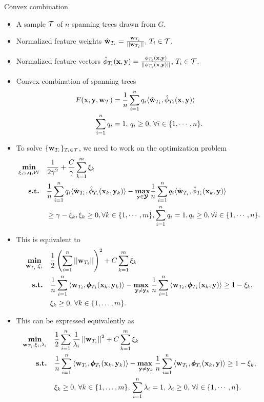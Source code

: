 \documentclass[first=dgreen,second=purple,logo=yellowexc]{aaltoslides}
\begin{document}
%
\begin{frame}[allowframebreaks]{Convex combination}
	\begin{itemize}\footnotesize
		\item A sample $\mathcal{T}$ of $n$ spanning trees drawn from $G$.
		\item Normalized feature weights $\hat{\mathbf {w}}_{T_i}=\frac{\mathbf {w}_{T_i}}{||\mathbf {w}_{T_i}||}, \, T_i\in\mathcal{T}$.
		\item Normalized feature vectors $\hat{\phi}_{T_i}(\mathbf {x},\mathbf {y})=\frac{\phi_{T_i}(\mathbf {x},\mathbf {y})}{||\phi_{T_i}(\mathbf {x},\mathbf {y})||}, \, T_i\in\mathcal{T}$.
		\item Convex combination of spanning trees
		\begin{align*}
			F(\mathbf {x},\mathbf {y},\mathbf {w}_{\mathcal{T}}) &= \frac{1}{{n}}\sum_{i=1}^{n}q_i\langle \hat{\mathbf {w}}_{T_i}, \hat{\phi}_{T_i}(\mathbf {x},\mathbf {y}) \rangle\\
			\sum_{i=1}^{n}q_i &= 1,\, q_i \ge 0,\, \forall i\in\{1,\cdots,n\}.
		\end{align*}
		\item To solve $\{\mathbf {w}_{T_i}\}_{T_i\in\mathcal{T}}$, we need to work on the optimization problem
		\begin{align*}
			\underset{\mathbf{\xi},\gamma,\mathbf {q},\mathcal{W}}{\textbf{min}} \quad& \frac{1}{2\gamma^2} + \frac{C}{\gamma}\sum_{k=1}^m\xi_k\\
			\textbf{s.t.} \quad& \frac{1}{{n}}\sum_{i=1}^{n}q_i\langle \hat{\mathbf {w}}_{T_i}, \hat{\phi}_{T_i}(\mathbf {x}_k,\mathbf {y}_k) \rangle -\underset{\mathbf {y}\in\pmb {\mathcal{Y}}}{\textbf{max}}\frac{1}{{n}}\sum_{i=1}^{n}q_i\langle \hat{\mathbf {w}}_{T_i}, \hat{\phi}_{T_i}(\mathbf {x}_k,\mathbf {y}) \rangle\\
			&\ge \gamma-\xi_k, \xi_k\ge 0,\forall k\in\{1,\cdots,m\},\sum_{i=1}^nq_i=1,q_i\ge0,\forall i\in\{1,\cdots,n\}.
		\end{align*}
		\item This is equivalent to
		\begin{align*}
			\underset{\mathbf {w}_{T_i},\xi_i}{\textbf{min}} & \quad \frac{1}{2}\left(\sum_{i=1}^{n}\left|\left| \mathbf {w}_{T_i} \right|\right|\right)^2 + C\sum_{k=1}^{m}\xi_k\\
			\textbf{s.t.} & \quad \frac{1}{{n}}\sum_{i=1}^{n}{ \langle \mathbf {w}_{T_i}, \pmb \phi_{T_t}(\mathbf {x}_k,\mathbf {y}_k) \rangle} - \underset{\mathbf {y} \neq \mathbf {y}_k}{\textbf{max}\ } \frac{1}{{n}}\sum_{i=1}^{n}{\langle \mathbf {w}_{T_t}, \pmb \phi_{T_i}(\mathbf {x}_k,\mathbf {y}) \rangle } \geq 1 -  \xi_k, \\
			& \quad \xi_k\ge0,\, \forall k \in \{ 1,\dots,m \}.
		\end{align*}
		\item This can be expressed equivalently as
		\begin{align*}
			\underset{\mathbf {w}_{T_i},\xi_i,\lambda_i}{\textbf{min}} & \quad \frac{1}{2}\sum_{i=1}^{n}\frac{1}{\lambda_{i}}\left|\left| \mathbf {w}_{T_i} \right|\right|^2 + C\sum_{k=1}^{m}\xi_k\\
			\textbf{s.t.} & \quad \frac{1}{{n}}\sum_{i=1}^{n}{ \langle \mathbf {w}_{T_i}, \pmb \phi_{T_t}(\mathbf {x}_k,\mathbf {y}_k) \rangle} - \underset{\mathbf {y} \neq \mathbf {y}_k}{\textbf{max}\ } \frac{1}{{n}}\sum_{i=1}^{n}{\langle \mathbf {w}_{T_t}, \pmb \phi_{T_i}(\mathbf {x}_k,\mathbf {y}) \rangle } \geq 1 -  \xi_k, \\
			& \quad \xi_k\ge0,\, \forall k \in \{ 1,\dots,m \},\, \sum_{i=1}^{n}\lambda_i=1,\,\lambda_i\ge0,\,\forall i\in\{1,\cdots,n\}.
		\end{align*}
	\end{itemize}
\end{frame}
\end{document}
